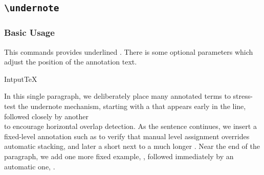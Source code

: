 \documentclass[luatex,fontsize=8pt,paper=b5,twoside]{jlreq}%
\begin{document}
\subsection{\texttt{\textbackslash undernote}}
\subsubsection{Basic Usage}
This commands provides underlined . There is some optional parameters which adjust the position of the annotation text.

\begin{SourceCode}{Intput}{TeX}

  In this single paragraph, we deliberately place many annotated terms to
  stress-test the undernote mechanism, starting with a
  that appears early in the line, followed closely by another\\
   to encourage horizontal overlap detection.
  As the sentence continues, we insert a fixed-level annotation such as
  to verify that manual level assignment overrides automatic stacking,
  and later a short
  next to a much longer
  .
  Near the end of the paragraph, we add one more fixed example,
  ,
  followed immediately by an automatic one,
  .
\end{SourceCode}
\end{document}
